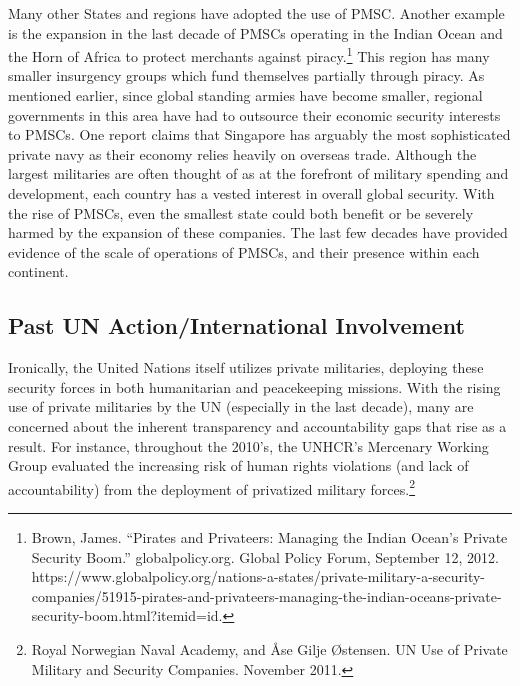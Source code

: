 \documentclass[10pt, letterpaper]{article}
\begin{document}
Many other States and regions have adopted the use of PMSC. Another
example is the expansion in the last decade of PMSCs operating in the
Indian Ocean and the Horn of Africa to protect merchants against
piracy.\footnote{Brown, James. ``Pirates and Privateers: Managing the
  Indian Ocean's Private Security Boom.'' globalpolicy.org. Global
  Policy Forum, September 12, 2012.
  https://www.globalpolicy.org/nations-a-states/private-military-a-security-companies/51915-pirates-and-privateers-managing-the-indian-oceans-private-security-boom.html?itemid=id.}
This region has many smaller insurgency groups which fund themselves
partially through piracy. As mentioned earlier, since global standing
armies have become smaller, regional governments in this area have had
to outsource their economic security interests to PMSCs. One report
claims that Singapore has arguably the most sophisticated private navy
as their economy relies heavily on overseas trade. Although the largest
militaries are often thought of as at the forefront of military spending
and development, each country has a vested interest in overall global
security. With the rise of PMSCs, even the smallest state could both
benefit or be severely harmed by the expansion of these companies. The
last few decades have provided evidence of the scale of operations of
PMSCs, and their presence within each continent. \\

\subsection{Past UN Action/International Involvement}

Ironically, the United Nations itself utilizes private militaries,
deploying these security forces in both humanitarian and peacekeeping
missions. With the rising use of private militaries by the UN
(especially in the last decade), many are concerned about the inherent
transparency and accountability gaps that rise as a result. For
instance, throughout the 2010's, the UNHCR's Mercenary Working Group
evaluated the increasing risk of human rights violations (and lack of
accountability) from the deployment of privatized military
forces.\footnote{Royal Norwegian Naval Academy, and Åse Gilje Østensen.
  UN Use of Private Military and Security Companies. November 2011.} \\
\end{document}
